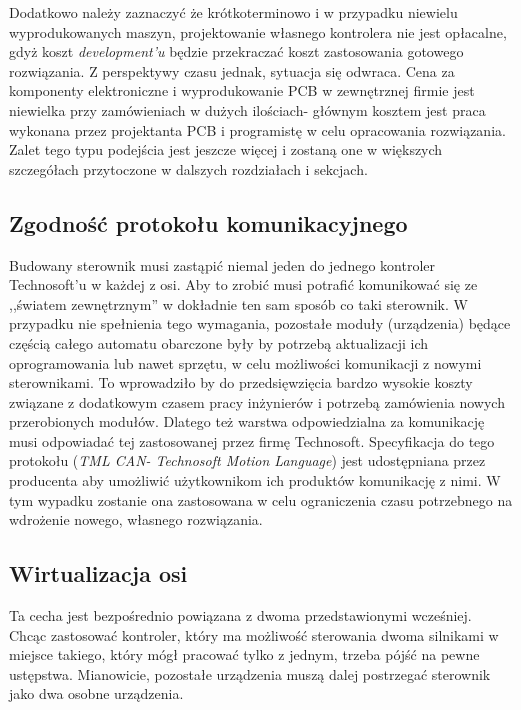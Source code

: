 Dodatkowo należy zaznaczyć że krótkoterminowo i w przypadku niewielu wyprodukowanych maszyn, projektowanie własnego kontrolera nie jest opłacalne, gdyż koszt {\it development'u} będzie przekraczać koszt zastosowania gotowego rozwiązania. Z perspektywy czasu jednak, sytuacja się odwraca. Cena za komponenty elektroniczne i wyprodukowanie PCB w zewnętrznej firmie jest niewielka przy zamówieniach w dużych ilościach- głównym kosztem jest praca wykonana przez projektanta PCB i programistę w celu opracowania rozwiązania. Zalet tego typu podejścia jest jeszcze więcej i zostaną one w większych szczegółach przytoczone w dalszych rozdziałach i sekcjach.

\subsection{Zgodność protokołu komunikacyjnego}

Budowany sterownik musi zastąpić niemal jeden do jednego kontroler Technosoft'u w każdej z osi. Aby to zrobić musi potrafić komunikować się ze ,,światem zewnętrznym'' w dokładnie ten sam sposób co taki sterownik. W przypadku nie spełnienia tego wymagania, pozostałe moduły (urządzenia) będące częścią całego automatu obarczone były by potrzebą aktualizacji ich oprogramowania lub nawet sprzętu, w celu możliwości komunikacji z nowymi sterownikami. To wprowadziło by do przedsięwzięcia bardzo wysokie koszty związane z dodatkowym czasem pracy inżynierów i potrzebą zamówienia nowych przerobionych modułów. Dlatego też warstwa odpowiedzialna za komunikację musi odpowiadać tej zastosowanej przez firmę Technosoft. Specyfikacja do tego protokołu ({\it TML CAN- Technosoft Motion Language}) jest udostępniana przez producenta aby umożliwić użytkownikom ich produktów komunikację z nimi. W tym wypadku zostanie ona zastosowana w celu  ograniczenia czasu potrzebnego na wdrożenie nowego, własnego rozwiązania.

\subsection{Wirtualizacja osi}
\label{ss:axis_virtualisation}

Ta cecha jest bezpośrednio powiązana z dwoma przedstawionymi wcześniej. Chcąc zastosować kontroler, który ma możliwość sterowania dwoma silnikami w miejsce takiego, który mógł pracować tylko z jednym, trzeba pójść na pewne ustępstwa. Mianowicie, pozostałe urządzenia muszą dalej postrzegać sterownik jako dwa osobne urządzenia.

